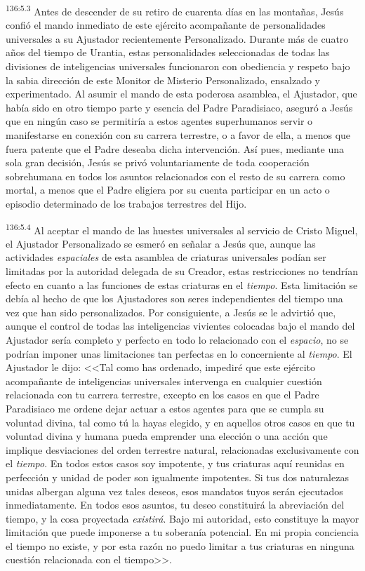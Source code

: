\par 
\textsuperscript{136:5.3} Antes de descender de su retiro de cuarenta días en las montañas, Jesús confió el mando inmediato de este ejército acompañante de personalidades universales a su Ajustador recientemente Personalizado. Durante más de cuatro años del tiempo de Urantia, estas personalidades seleccionadas de todas las divisiones de inteligencias universales funcionaron con obediencia y respeto bajo la sabia dirección de este Monitor de Misterio Personalizado, ensalzado y experimentado. Al asumir el mando de esta poderosa asamblea, el Ajustador, que había sido en otro tiempo parte y esencia del Padre Paradisiaco, aseguró a Jesús que en ningún caso se permitiría a estos agentes superhumanos servir o manifestarse en conexión con su carrera terrestre, o a favor de ella, a menos que fuera patente que el Padre deseaba dicha intervención. Así pues, mediante una sola gran decisión, Jesús se privó voluntariamente de toda cooperación sobrehumana en todos los asuntos relacionados con el resto de su carrera como mortal, a menos que el Padre eligiera por su cuenta participar en un acto o episodio determinado de los trabajos terrestres del Hijo.

\par 
\textsuperscript{136:5.4} Al aceptar el mando de las huestes universales al servicio de Cristo Miguel, el Ajustador Personalizado se esmeró en señalar a Jesús que, aunque las actividades \textit{espaciales} de esta asamblea de criaturas universales podían ser limitadas por la autoridad delegada de su Creador, estas restricciones no tendrían efecto en cuanto a las funciones de estas criaturas en el \textit{tiempo}. Esta limitación se debía al hecho de que los Ajustadores son seres independientes del tiempo una vez que han sido personalizados. Por consiguiente, a Jesús se le advirtió que, aunque el control de todas las inteligencias vivientes colocadas bajo el mando del Ajustador sería completo y perfecto en todo lo relacionado con el \textit{espacio}, no se podrían imponer unas limitaciones tan perfectas en lo concerniente al \textit{tiempo}. El Ajustador le dijo: <<Tal como has ordenado, impediré que este ejército acompañante de inteligencias universales intervenga en cualquier cuestión relacionada con tu carrera terrestre, excepto en los casos en que el Padre Paradisiaco me ordene dejar actuar a estos agentes para que se cumpla su voluntad divina, tal como tú la hayas elegido, y en aquellos otros casos en que tu voluntad divina y humana pueda emprender una elección o una acción que implique desviaciones del orden terrestre natural, relacionadas exclusivamente con el \textit{tiempo}. En todos estos casos soy impotente, y tus criaturas aquí reunidas en perfección y unidad de poder son igualmente impotentes. Si tus dos naturalezas unidas albergan alguna vez tales deseos, esos mandatos tuyos serán ejecutados inmediatamente. En todos esos asuntos, tu deseo constituirá la abreviación del tiempo, y la cosa proyectada \textit{existirá}. Bajo mi autoridad, esto constituye la mayor limitación que puede imponerse a tu soberanía potencial. En mi propia conciencia el tiempo no existe, y por esta razón no puedo limitar a tus criaturas en ninguna cuestión relacionada con el tiempo>>.


